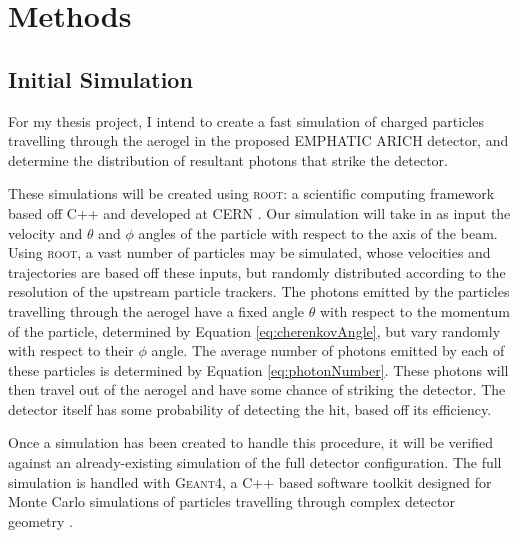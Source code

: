 
\chapter{Methods}
\label{ch:Methods}

\section{Initial Simulation}
\label{sec:experiment}
For my thesis project, I intend to create a fast simulation of charged particles travelling through the aerogel in the proposed \ac{EMPHATIC} \ac{ARICH} detector, and determine the distribution of resultant photons that strike the detector. 

These simulations will be created using \textsc{root}: a scientific computing framework based off C++ and developed at CERN \cite{root}.
Our simulation will take in as input the velocity and $\theta$ and $\phi$ angles of the particle with respect to the axis of the beam.
Using \textsc{root}, a vast number of particles may be simulated, whose velocities and trajectories are based off these inputs, but randomly distributed according to the resolution of the upstream particle trackers.
The photons emitted by the particles travelling through the aerogel have a fixed angle $\theta$ with respect to the momentum of the particle, determined by Equation \ref{eq:cherenkovAngle}, but vary randomly with respect to their $\phi$ angle.
The average number of photons emitted by each of these particles is determined by Equation \ref{eq:photonNumber}.
These photons will then travel out of the aerogel and have some chance of striking the detector.
The detector itself has some probability of detecting the hit, based off its efficiency. 

Once a simulation has been created to handle this procedure, it will be verified against an already-existing simulation of the full detector configuration.
The full simulation is handled with \textsc{Geant4}, a C++ based software toolkit designed for Monte Carlo simulations of particles travelling through complex detector geometry  \cite{geant4}.

